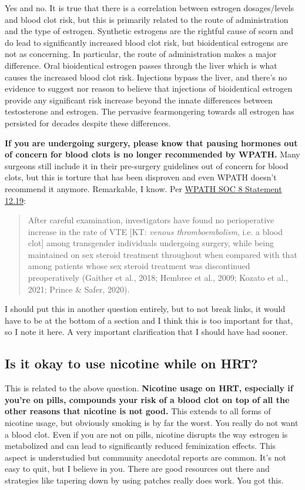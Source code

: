 \documentclass{article}
\begin{document}
Yes and no. It is true that there is a correlation between estrogen dosages/levels and blood clot risk, but this is primarily related to the route of administration and the type of estrogen. Synthetic estrogens are the rightful cause of scorn and do lead to significantly increased blood clot risk, but bioidentical estrogens are not as concerning. In particular, the route of administration makes a major difference. Oral bioidentical estrogen passes through the liver which is what causes the increased blood clot risk. Injections bypass the liver, and there's no evidence to suggest nor reason to believe that injections of bioidentical estrogen provide any significant risk increase beyond the innate differences between testosterone and estrogen. The pervasive fearmongering towards all estrogen has persisted for decades despite these differences.

\textbf{If you are undergoing surgery, please know that pausing hormones out of concern for blood clots is no longer recommended by WPATH.} Many surgeons still include it in their pre-surgery guidelines out of concern for blood clots, but this is torture that has been disproven and even WPATH doesn't recommend it anymore. Remarkable, I know. Per \href{https://www.tandfonline.com/doi/pdf/10.1080/26895269.2022.2100644}{WPATH SOC 8 Statement 12.19}: \blockquote{After careful examination, investigators have found no perioperative increase in the rate of VTE [KT: \textit{venous thromboembolism}, i.e. a blood clot] among transgender individuals undergoing surgery, while being maintained on sex steroid treatment throughout when compared with that among patients whose sex steroid treatment was discontinued preoperatively (Gaither et al., 2018; Hembree et al., 2009; Kozato et al., 2021; Prince \& Safer, 2020).} I should put this in another question entirely, but to not break links, it would have to be at the bottom of a section and I think this is too important for that, so I note it here. A very important clarification that I should have had sooner.

\subsection{Is it okay to use nicotine while on HRT?}\label{11-2}

This is related to the above question. \textbf{Nicotine usage on HRT, especially if you’re on pills, compounds your risk of a blood clot on top of all the other reasons that nicotine is not good.} This extends to all forms of nicotine usage, but obviously smoking is by far the worst. You really do not want a blood clot. Even if you are not on pills, nicotine disrupts the way estrogen is metabolized and can lead to significantly reduced feminization effects. This aspect is understudied but community anecdotal reports are common. It’s not easy to quit, but I believe in you. There are good resources out there and strategies like tapering down by using patches really does work. You got this.
\end{document}
